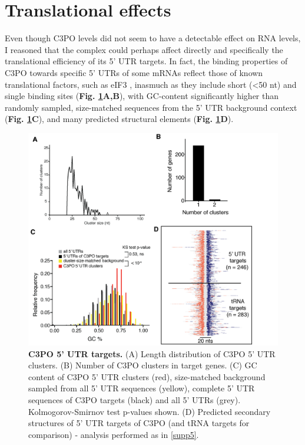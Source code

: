 \documentclass[12pt]{rockefeller}
\begin{document}
\section{Translational effects}

Even though C3PO levels did not seem to have a detectable effect on RNA levels, I reasoned that the complex could perhaps affect directly and specifically the translational efficiency of its 5' UTR targets. In fact, the binding properties of C3PO towards specific 5’ UTRs of some mRNAs reflect those of known translational factors, such as eIF3 \cite{Lee:2015he}, inasmuch as they include short (<50 nt) and single binding sites (\textbf{Fig. \ref{5utr}A,B}), with GC-content significantly higher than randomly sampled, size-matched sequences from the 5’ UTR background context (\textbf{Fig. \ref{5utr}C}), and many predicted structural elements (\textbf{Fig. \ref{5utr}D}).

\begin{figure}[!ht]%
\centering
\includegraphics[width=\textwidth]{c3po5.png} 
\caption[C3PO 5' UTR targets.]
{
\textbf{C3PO 5' UTR targets.}
(A) Length distribution of C3PO 5' UTR clusters. (B) Number of C3PO clusters in target genes. (C) GC content of C3PO 5' UTR clusters (red), size-matched background sampled from all 5' UTR sequences (yellow), complete 5' UTR sequences of C3PO targets (black) and all 5' UTRs (grey). Kolmogorov-Smirnov test p-values shown. (D) Predicted secondary structures of 5' UTR targets of C3PO (and tRNA targets for comparison) - analysis performed as in \ref{supp5}.
}
\centering
\label{5utr}%
\end{figure}
\end{document}
